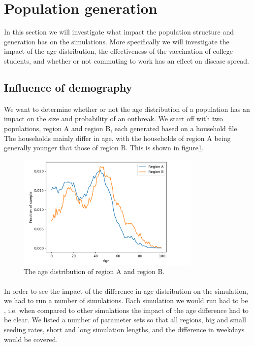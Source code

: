 \documentclass[runningheads]{llncs}
\begin{document}
\newpage
\section{Population generation}

In this section we will investigate what impact the population structure and generation has on the simulations. More specifically we will investigate the impact of the age distribution, the effectiveness of the vaccination of college students, and whether or not commuting to work has an effect on disease spread.

\subsection{Influence of demography}

\paragraph{} We want to determine whether or not the age distribution of a population has an impact on the size and probability of an outbreak. We start off with two populations, region A and region B, each generated based on a household file. The households mainly differ in age, with the households of region A being generally younger that those of region B. This is shown in figure\ref{2_1_regionDiff_plotAgeDistr}.

\begin{figure}[h!]
	\centering
	\includegraphics[width=0.8\textwidth]{./2_1_regionDiff/plot_ageDistr.png}
	\caption{The age distribution of region A and region B.}
	\label{2_1_regionDiff_plotAgeDistr}
\end{figure}

\paragraph{} In order to see the impact of the difference in age distribution on the simulation, we had to run a number of simulations. Each simulation we would run had to be , i.e. when compared to other simulations the impact of the age difference had to be clear. We listed a number of parameter sets so that all regions, big and small seeding rates, short and long simulation lengths, and the difference in weekdays would be covered.
\end{document}
